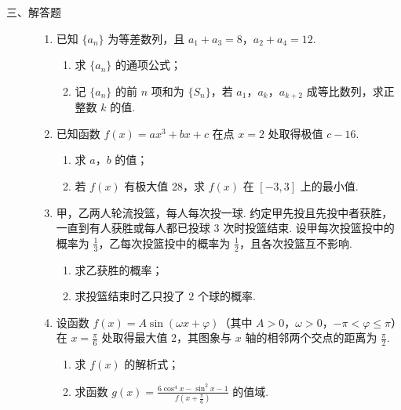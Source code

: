 \begin{description}

    \item[三、解答题]

    \begin{enumerate}[leftmargin=5pt]

      \addtocounter{enumi}{+15}

        \item 已知 \(\{a_{n}\}\) 为等差数列，且 \(a_{1}+a_{3}=8\)，\(a_{2}+a_{4}=12\).

\begin{enumerate}
\item 求 \(\{a_{n}\}\) 的通项公式；
\item 记 \(\{a_{n}\}\) 的前 \(n\) 项和为 \(\{S_{n}\}\)，若 \(a_{1}\)，\(a_{k}\)，\(a_{k+2}\) 成等比数列，求正整数 \(k\) 的值.
\end{enumerate}

        \item 已知函数 \(f(x)=ax^3+bx+c\) 在点 \(x=2\) 处取得极值 \(c-16\).

\begin{enumerate}
\item 求 \(a\)，\(b\) 的值；
\item 若 \(f(x)\) 有极大值 28，求 \(f(x)\) 在 \([-3,3]\) 上的最小值.
\end{enumerate}

        \item 甲，乙两人轮流投篮，每人每次投一球. 约定甲先投且先投中者获胜，一直到有人获胜或每人都已投球 \(3\) 次时投篮结束. 设甲每次投篮投中的概率为 \(\frac{1}{3}\)，乙每次投篮投中的概率为 \(\frac{1}{2}\)，且各次投篮互不影响.

\begin{enumerate}
\item 求乙获胜的概率；
\item 求投篮结束时乙只投了 \(2\) 个球的概率.
\end{enumerate}

        \item 设函数 \(f(x)=A\sin(\omega x+\varphi)\)（其中 \(A>0\)，\(\omega>0\)，\(-\pi<\varphi\leqslant \pi\)）在 \(x=\frac{\pi}{6}\) 处取得最大值 2，其图象与 \(x\) 轴的相邻两个交点的距离为 \(\frac{\pi}{2}\).

\begin{enumerate}
\item 求 \(f(x)\) 的解析式；
\item 求函数 \(g(x)=\frac{6\cos^{4}x-\sin^{2}x-1}{f\left(x+\frac{\pi}{6}\right)}\) 的值域.
\end{enumerate}


\end{enumerate}
\end{description}

